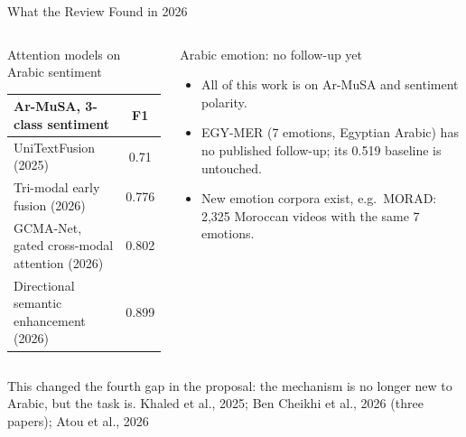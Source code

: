 \documentclass[aspectratio=169,10pt]{beamer}
\newcommand{\source}[1]{\vspace{0.05cm}\hfill{\scriptsize\textcolor{MutedGray}{#1}}}
\begin{document}
\begin{frame}[t]{What the Review Found in 2026}
\begin{columns}[T,onlytextwidth]
\begin{block}{Attention models on Arabic sentiment}
\centering\small
\begin{tabular}{@{}lc@{}}
\toprule
Ar-MuSA, 3-class sentiment & F1 \\
\midrule
UniTextFusion (2025) & 0.71 \\
Tri-modal early fusion (2026) & 0.776 \\
GCMA-Net, gated cross-modal attention (2026) & 0.802 \\
Directional semantic enhancement (2026) & 0.899 \\
\bottomrule
\end{tabular}
\end{block}
\begin{block}{Arabic emotion: no follow-up yet}
\begin{itemize}
  \item All of this work is on Ar-MuSA and sentiment polarity.
  \item EGY-MER (7 emotions, Egyptian Arabic) has no published follow-up; its 0.519 baseline is untouched.
  \item New emotion corpora exist, e.g.\ MORAD: 2,325 Moroccan videos with the same 7 emotions.
\end{itemize}
\end{block}
\end{columns}
\vspace{0.3cm}
\small This changed the fourth gap in the proposal: the mechanism is no longer new to Arabic, but the task is.
\source{Khaled et al., 2025; Ben Cheikhi et al., 2026 (three papers); Atou et al., 2026}
\end{frame}
\end{document}
